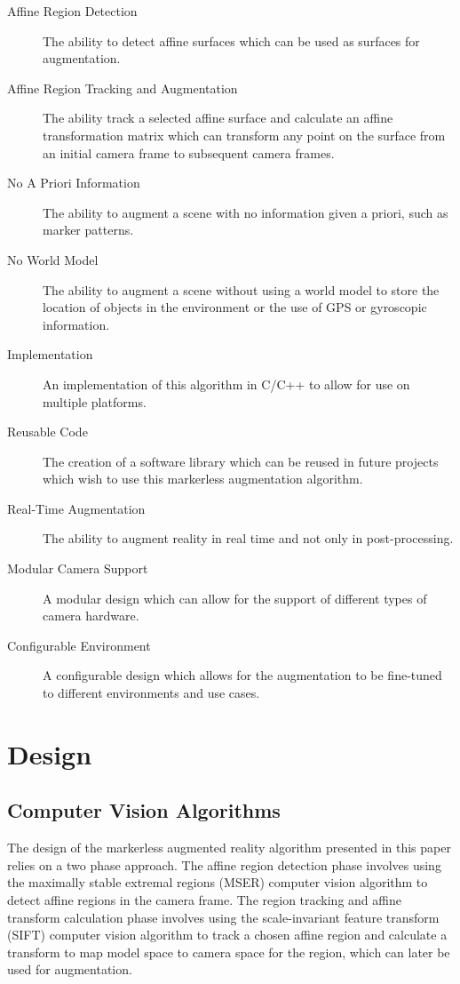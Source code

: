 \documentclass[oneside,11pt]{Latex/Classes/PhDthesisPSnPDF}
\begin{document}
\begin{description}
\item[Affine Region Detection] The ability to detect affine surfaces which can be used as surfaces for augmentation.
\item[Affine Region Tracking and Augmentation] The ability track a selected affine surface and calculate an affine transformation matrix which can transform any point on the surface from an initial camera frame to subsequent camera frames.
\item[No A Priori Information] The ability to augment a scene with no information given a priori, such as marker patterns.
\item[No World Model] The ability to augment a scene without using a world model to store the location of objects in the environment or the use of GPS or gyroscopic information. 
\item[Implementation] An implementation of this algorithm in C/C++ to allow for use on multiple platforms.
\item[Reusable Code] The creation of a software library which can be reused in future projects which wish to use this markerless augmentation algorithm.
\item[Real-Time Augmentation] The ability to augment reality in real time and not only in post-processing.
\item[Modular Camera Support] A modular design which can allow for the support of different types of camera hardware.
\item[Configurable Environment] A configurable design which allows for the augmentation to be fine-tuned to different environments and use cases.

\end{description}

\chapter{Design}

\section{Computer Vision Algorithms}

The design of the markerless augmented reality algorithm presented in this paper relies on a two phase approach.  The affine region detection phase involves using the maximally stable extremal regions (MSER) computer vision algorithm to detect affine regions in the camera frame.  The region tracking and affine transform calculation phase involves using the scale-invariant feature transform (SIFT) computer vision algorithm to track a chosen affine region and calculate a transform to map model space to camera space for the region, which can later be used for augmentation.
\end{document}
